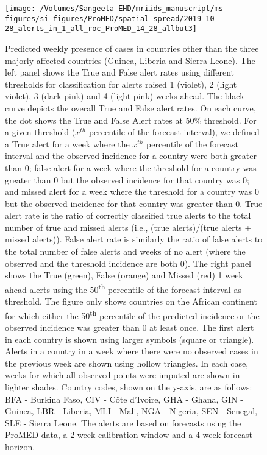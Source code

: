 \documentclass[9pt,twoside,lineno]{pnas-new}
\begin{document}
\begin{figure}
\centering
\texttt{[image: /Volumes/Sangeeta EHD/mriids\_manuscript/ms-figures/si-figures/ProMED/spatial\_spread/2019-10-28\_alerts\_in\_1\_all\_roc\_ProMED\_14\_28\_allbut3]}
\caption{Predicted weekly presence of cases in
countries other than the three majorly affected countries (Guinea,
Liberia and Sierra Leone). The left panel shows the True and False alert rates using
different thresholds for classification for alerts raised 1 (violet), 2
(light violet), 3 (dark pink) and 4 (light pink) weeks ahead. The
black curve depicts the overall True and False alert rates. On each
curve, the dot shows the True and False Alert rates at 50\% threshold.
For a given threshold (\(x^{th}\)
percentile of the forecast interval), we defined a True alert for a week
where the \(x^{th}\) percentile of the forecast interval and the
observed incidence for a country were both greater than 0; false alert
for a week where the threshold for a country was greater than 0 but the
observed incidence for that country was 0; and missed alert for a week where
the threshold for a country was 0 but the observed incidence for that
country was greater than 0. True alert rate is the ratio of correctly
classified true alerts to the total number of true and missed alerts
(i.e., (true alerts)/(true alerts + missed alerts)). False alert rate is
similarly the ratio of false alerts to the total number of false alerts
and weeks of no alert (where the observed and the threshold incidence
are both 0). The right panel shows the True (green), False (orange) and
Missed (red) 1 week ahead alerts using the 50\textsuperscript{th} percentile of the
forecast interval as threshold. 
The figure only shows countries on the
African continent for which either the 50\textsuperscript{th}
percentile of the predicted incidence or the
observed incidence was greater than 0 at least once. 
The first alert in each country is shown
using larger symbols (square or triangle). Alerts in a country in a
week where there were no observed cases in the previous week are shown
using hollow triangles. In each case, weeks for which all observed points
were imputed are shown in lighter shades.
Country codes, shown on the y-axis, are as
follows: BFA - Burkina Faso, CIV - Côte d'Ivoire,
GHA - Ghana, GIN - Guinea, LBR - Liberia, MLI - Mali, NGA - Nigeria,
SEN - Senegal, SLE - Sierra Leone. The alerts are based on forecasts 
using the ProMED data, a 2-week calibration window and a 4 week
forecast horizon.}
\label{fig:alertsallbut3}
\end{figure}\FloatBarrier
\end{document}
